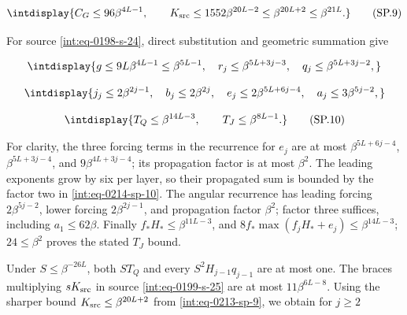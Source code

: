 \begingroup\renewcommand{\theHequation}{intdisplay.431}
\begin{equation}
\intdisplay{
C_G\le96\beta^{4L-1},\qquad
K_{\rm src}\le1552\beta^{20L-2}
\le\beta^{20L+2}\le\beta^{21L}.
}
\tag{SP.9}
\label{int:eq-0213-sp-9}
\end{equation}
\endgroup


For source \eqref{int:eq-0198-s-24}, direct substitution and geometric summation give


\begingroup\renewcommand{\theHequation}{intdisplay.432}
\begin{equation*}
\intdisplay{
g\le9L\beta^{4L-1}\le\beta^{5L-1},\quad
r_j\le\beta^{5L+3j-3},\quad q_j\le\beta^{5L+3j-2},
}
\end{equation*}
\endgroup

\begingroup\renewcommand{\theHequation}{intdisplay.433}
\begin{equation*}
\intdisplay{
j_j\le2\beta^{2j-1},\quad b_j\le2\beta^{2j},\quad
e_j\le2\beta^{5L+6j-4},\quad a_j\le3\beta^{5j-2},
}
\end{equation*}
\endgroup

\begingroup\renewcommand{\theHequation}{intdisplay.434}
\begin{equation}
\intdisplay{
{T_Q\le\beta^{14L-3},\qquad T_J\le\beta^{8L-1}.}
}
\tag{SP.10}
\label{int:eq-0214-sp-10}
\end{equation}
\endgroup


For clarity, the three forcing terms in the recurrence for \(e_j\) are at most \(\beta^{5L+6j-4}\), \(\beta^{5L+3j-4}\), and \(9\beta^{4L+3j-4}\); its propagation factor is at most \(\beta^2\). The leading exponents grow by six per layer, so their propagated sum is bounded by the factor two in \eqref{int:eq-0214-sp-10}. The angular recurrence has leading forcing \(2\beta^{5j-2}\), lower forcing \(2\beta^{2j-1}\), and propagation factor \(\beta^2\); factor three suffices, including \(a_1\le62\beta\). Finally \(f_*H_*\le\beta^{11L-3}\), and \(8f_*\max(f_jH_*+e_j)\le\beta^{14L-3}\); \(24\le\beta^2\) proves the stated \(T_J\) bound.



Under \(S\le\beta^{-26L}\), both \(ST_Q\) and every \(S^2H_{j-1}q_{j-1}\) are at most one. The braces multiplying \(sK_{\rm src}\) in source \eqref{int:eq-0199-s-25} are at most \(11\beta^{6L-8}\). Using the sharper bound \(K_{\rm src}\le\beta^{20L+2}\) from \eqref{int:eq-0213-sp-9}, we obtain for \(j\ge2\)


